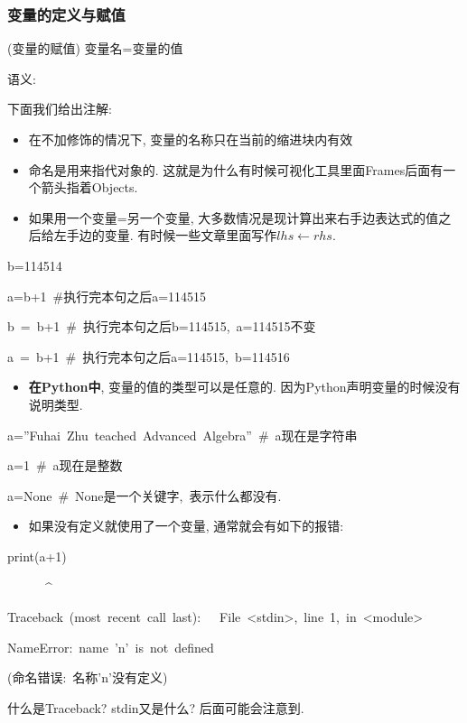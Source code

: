 \subsubsection{变量的定义与赋值}
\begin{definition}
(变量的赋值) 变量名=变量的值
\end{definition}
语义: 

下面我们给出注解:
\begin{itemize}
\item 在不加修饰的情况下, 变量的名称只在当前的缩进块内有效
\item 命名是用来指代对象的. 这就是为什么有时候可视化工具里面Frames后面有一个箭头指着Objects.
\item 如果用一个变量=另一个变量, 大多数情况是现计算出来右手边表达式的值之后给左手边的变量. 有时候一些文章里面写作$lhs\leftarrow rhs$.
\end{itemize}
\begin{lyxcode}
b=114514

a=b+1~\#执行完本句之后a=114515

b~=~b+1~\#~执行完本句之后b=114515,~a=114515不变

a~=~b+1~\#~执行完本句之后a=114515,~b=114516
\end{lyxcode}
\begin{itemize}
\item \textbf{在Python中}, 变量的值的类型可以是任意的. 因为Python声明变量的时候没有说明类型.
\end{itemize}
\begin{lyxcode}
a=''Fuhai~Zhu~teached~Advanced~Algebra''~\#~a现在是字符串

a=1~\#~a现在是整数

a=None~\#~None是一个关键字,~表示什么都没有.
\end{lyxcode}
\begin{itemize}
\item 如果没有定义就使用了一个变量, 通常就会有如下的报错:
\end{itemize}
\begin{lyxcode}
print(a+1)

~~~~~~\textasciicircum{}

Traceback~(most~recent~call~last):~~~File~\textquotedbl <stdin>\textquotedbl ,~line~1,~in~<module>~

NameError:~name~'n'~is~not~defined

(命名错误:~名称'n'没有定义)
\end{lyxcode}
什么是Traceback? stdin又是什么? 后面可能会注意到. 

